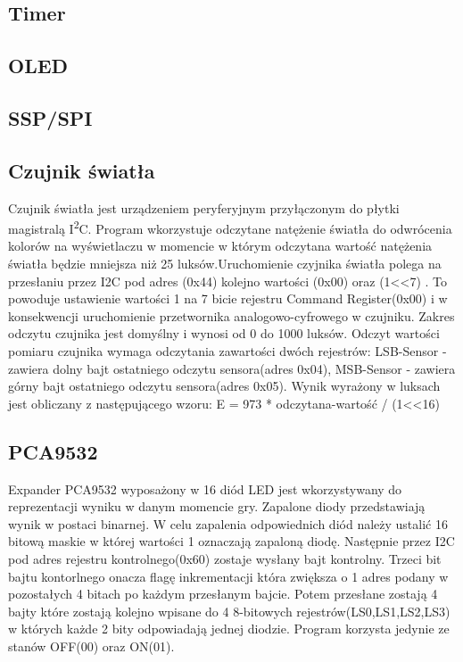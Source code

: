 \documentclass{classrep}
\begin{document}
		\subsection{Timer}
		
		\subsection{OLED}
		
		\subsection{SSP/SPI}
		
		\subsection{Czujnik światła}
Czujnik światła jest urządzeniem peryferyjnym przyłączonym do płytki magistralą I\textsuperscript2C. Program wkorzystuje odczytane natężenie światła do odwrócenia kolorów na 			wyświetlaczu w momencie w którym odczytana wartość natężenia światła będzie mniejsza niż 25 luksów.\indent Uruchomienie czyjnika światła polega na przesłaniu przez	
I2C pod adres (0x44) kolejno wartości (0x00) oraz (1<<7) . To powoduje ustawienie wartości 1 na 7 bicie rejestru Command Register(0x00) i w konsekwencji 	uruchomienie przetwornika analogowo-cyfrowego w czujniku. Zakres odczytu czujnika jest domyślny i wynosi od 0 do 1000 luksów. Odczyt wartości pomiaru czujnika wymaga 				odczytania zawartości dwóch rejestrów:  LSB-Sensor - zawiera dolny bajt ostatniego odczytu sensora(adres 0x04), MSB-Sensor - zawiera górny bajt ostatniego odczytu 					sensora(adres 0x05). Wynik wyrażony w luksach jest obliczany z następującego wzoru: E = 973 * odczytana-wartość /  (1<<16)
\subsection{PCA9532}
Expander PCA9532 wyposażony w 16 diód LED jest wkorzystywany do reprezentacji wyniku w danym momencie gry. Zapalone diody przedstawiają wynik w postaci binarnej.
W celu zapalenia odpowiednich diód należy ustalić 16 bitową maskie w której wartości 1 oznaczają zapaloną diodę. Następnie przez I2C pod adres rejestru kontrolnego(0x60)  				zostaje wysłany bajt kontrolny. Trzeci  bit bajtu kontorlnego onacza flagę inkrementacji która zwiększa o 1 adres podany w pozostałych 4 bitach po każdym przesłanym bajcie. 				Potem przesłane zostają 4 bajty które zostają kolejno wpisane do 4  8-bitowych rejestrów(LS0,LS1,LS2,LS3) w których każde 2 bity odpowiadają jednej diodzie. Program korzysta 				jedynie ze stanów OFF(00) oraz ON(01).
\end{document}
